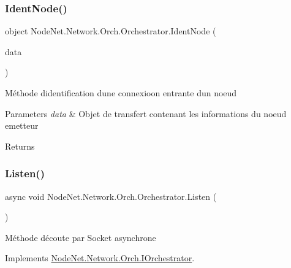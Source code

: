 \subsubsection{\texorpdfstring{Ident\+Node()}{IdentNode()}}
{\footnotesize\ttfamily object Node\+Net.\+Network.\+Orch.\+Orchestrator.\+Ident\+Node (\begin{DoxyParamCaption}\item[{\hyperlink{class_node_net_1_1_data_1_1_data_input}{Data\+Input}}]{data }\end{DoxyParamCaption})}



Méthode d\textquotesingle{}identification d\textquotesingle{}une connexioon entrante d\textquotesingle{}un noeud 


\begin{DoxyParams}{Parameters}
{\em data} & Objet de transfert contenant les informations du noeud emetteur\\
\hline
\end{DoxyParams}
\begin{DoxyReturn}{Returns}

\end{DoxyReturn}
\mbox{\label{class_node_net_1_1_network_1_1_orch_1_1_orchestrator_a3adf37c5b27377234431ecdec0a2dc98}} 
\subsubsection{\texorpdfstring{Listen()}{Listen()}}
{\footnotesize\ttfamily async void Node\+Net.\+Network.\+Orch.\+Orchestrator.\+Listen (\begin{DoxyParamCaption}{ }\end{DoxyParamCaption})}



Méthode d\textquotesingle{}écoute par Socket asynchrone 



Implements \hyperlink{interface_node_net_1_1_network_1_1_orch_1_1_i_orchestrator_a7f0164bff7a43551534f015165ddd3d4}{Node\+Net.\+Network.\+Orch.\+I\+Orchestrator}.

\mbox{\label{class_node_net_1_1_network_1_1_orch_1_1_orchestrator_a1868c3dad9eb8763a7aaae1ef15862ed}} 
